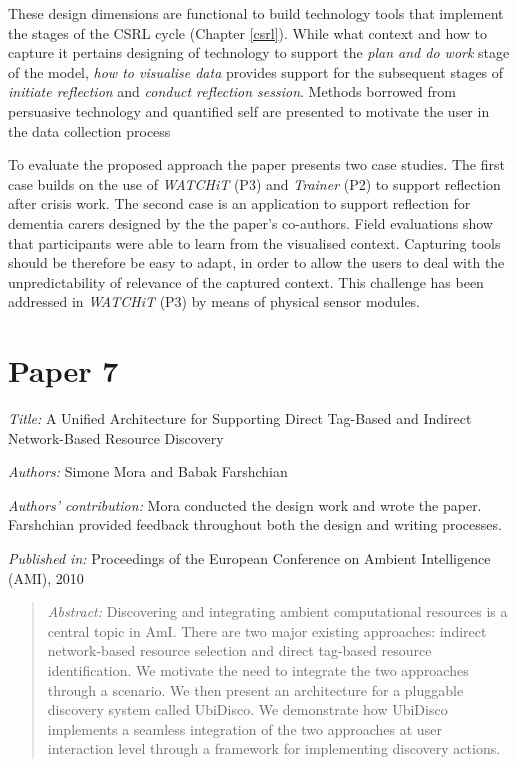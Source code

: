 These design dimensions are functional to build technology tools that implement the stages of the CSRL cycle (Chapter \ref{csrl}). While what context and how to capture it pertains designing of technology to support the \emph{plan and do work} stage of the model, \emph{how to visualise data} provides support for the subsequent stages of \emph{initiate reflection} and \emph{conduct reflection session}. Methods borrowed from persuasive technology and quantified self are presented to motivate the user in the data collection process

To evaluate the proposed approach the paper presents two case studies. The first case builds on the use of \emph{WATCHiT} (P3) and \emph{Trainer} (P2) to support reflection after crisis work. The second case is an application to support reflection for dementia carers designed by the the paper's co-authors. Field evaluations show that participants were able to learn from the visualised context. Capturing tools should be therefore be easy to adapt, in order to allow the users to deal with the unpredictability of relevance of the captured context. This challenge has been addressed in \emph{WATCHiT} (P3) by means of physical sensor modules.


\section[P7: A Unified Architecture for Supporting Direct Tag-Based and Indirect Network-Based Resource Discovery][Paper 7]{Paper 7}\label{paper-7}

\emph{Title:} A Unified Architecture for Supporting Direct Tag-Based and Indirect Network-Based Resource Discovery

\emph{Authors:} Simone Mora and Babak Farshchian

\emph{Authors' contribution:} Mora conducted the design work and wrote the paper. Farshchian provided feedback throughout both the design and writing processes.

\emph{Published in:} Proceedings of the European Conference on Ambient Intelligence (AMI), 2010 
\begin{quote}
	\emph{Abstract:} Discovering and integrating ambient computational resources is a central topic in AmI. There are two major existing approaches: indirect network-based resource selection and direct tag-based resource identification. We motivate the need to integrate the two approaches through a scenario. We then present an architecture for a pluggable discovery system called UbiDisco. We demonstrate how UbiDisco implements a seamless integration of the two approaches at user interaction level through a framework for implementing discovery actions. 
\end{quote}

